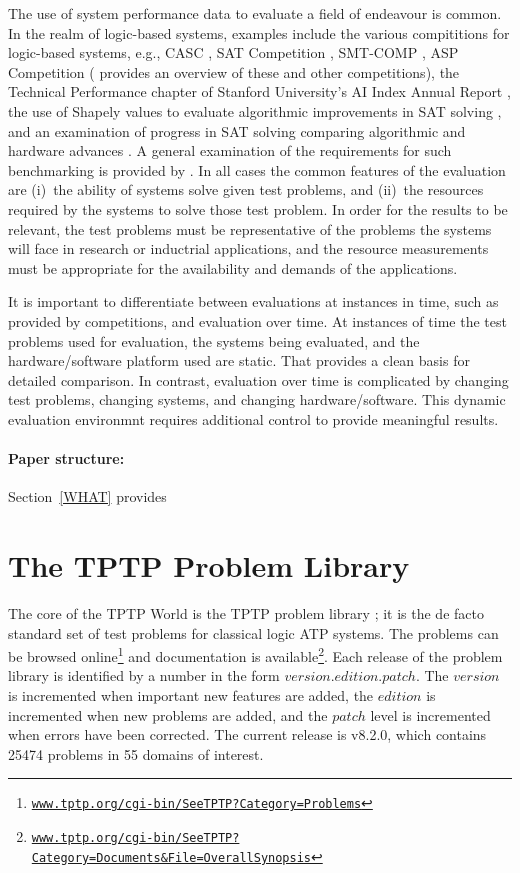 \documentclass[runningheads]{llncs}
\begin{document}
The use of system performance data to evaluate a field of endeavour is common.
In the realm of logic-based systems, examples include
the various compititions for logic-based systems, e.g., CASC \cite{Sut16}, SAT Competition 
\cite{JL+12}, SMT-COMP \cite{BdS05}, ASP Competition \cite{CI+12} (\cite{BB+19} provides an 
overview of these and other competitions),
the Technical Performance chapter of Stanford University's AI Index Annual Report \cite{MF+23},
the use of Shapely values to evaluate algorithmic improvements in SAT solving \cite{FK+16,KF+19},
and
an examination of progress in SAT solving comparing algorithmic and hardware advances \cite{FHS20}.
A general examination of the requirements for such benchmarking is provided by \cite{BLW19}.
In all cases the common features of the evaluation are (i)~the ability of systems solve given test
problems, and (ii)~the resources required by the systems to solve those test problem.
In order for the results to be relevant, the test problems must be representative of the problems
the systems will face in research or inductrial applications, and the resource measurements must
be appropriate for the availability and demands of the applications.

It is important to differentiate between evaluations at instances in time, such as provided by
competitions, and evaluation over time.
At instances of time the test problems used for evaluation, the systems being evaluated, and
the hardware/software platform used are static.
That provides a clean basis for detailed comparison.
In contrast, evaluation over time is complicated by changing test problems, changing systems,
and changing hardware/software.
This dynamic evaluation environmnt requires additional control to provide meaningful results.

\paragraph{Paper structure:}
Section~\ref{WHAT} provides 

\section{The TPTP Problem Library}
\label{TPTP}

The core of the TPTP World is the TPTP problem library \cite{Sut09}; it is the de facto standard 
set of test problems for classical logic ATP systems.
The problems can be browsed online\footnote{%
\href{https://www.tptp.org/cgi-bin/SeeTPTP?Category=Problems}
{\tt www.tptp.org/cgi-bin/SeeTPTP?Category=Problems}}
and documentation is available\footnote{%
\href{https://www.tptp.org/cgi-bin/SeeTPTP?Category=Documents\&File=OverallSynopsis}
{\tt www.tptp.org/cgi-bin/SeeTPTP?Category=Documents\&File=OverallSynopsis}}.
Each release of the problem library is identified by a number in the form 
$version$.$edition$.$patch$.
The $version$ is incremented when important new features are added,
the $edition$ is incremented when new problems are added, and
the $patch$ level is incremented when errors have been corrected.
The current release is v8.2.0, which contains 25474 problems in 55 domains of interest.
\end{document}
